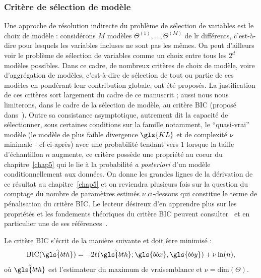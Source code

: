 \subsubsection{Critère de sélection de modèle} \label{subsubsec:choix_modele}

Une approche de résolution indirecte du problème de sélection de variables est le choix de modèle : considérons $M$ modèles $\Theta^{(1)},\dots,\Theta^{(M)}$ de \gls{lr} différents, c'est-à-dire pour lesquels les variables incluses ne sont pas les mêmes. On peut d'ailleurs voir le problème de sélection de variables comme un choix entre tous les $2^d$ modèles possibles. Dans ce cadre, de nombreux critères de choix de modèle, voire d'aggrégation de modèles, c'est-à-dire de sélection de tout ou partie de ces modèles en pondérant leur contribution globale, ont été proposés. La justification de ces critères sort largement du cadre de ce manuscrit ; aussi nous nous limiterons, dans le cadre de la sélection de modèle, au critère BIC (proposé dans~\cite{BIC}). Outre sa consistance asymptotique, autrement dit la capacité de sélectionner, sous certaines conditions sur la famille notamment, le ``quasi-vrai'' modèle (le modèle de plus faible divergence $\gls{KL}$ et de complexité $\nu$ minimale - cf ci-après) avec une probabilité tendant vers $1$ lorsque la taille d'échantillon $n$ augmente, ce critère possède une propriété au coeur du chapitre~\ref{chap5} qui le lie à la probabilité \textit{a posteriori} d'un modèle conditionnellement aux données. On donne les grandes lignes de la dérivation de ce résultat au chapitre~\ref{chap5} et on reviendra plusieurs fois sur la question du comptage du nombre de paramètres estimés $\nu$ ci-dessous qui constitue le terme de pénalisation du critère BIC. Le lecteur désireux d'en apprendre plus sur les propriétés et les fondements théoriques du critère BIC peuvent consulter~\cite{lebarbier} et en particulier une de ses références~\cite{burnham2003model}.

Le critère BIC s'écrit de la manière suivante et doit être minimisé :
\begin{equation}
    \label{eq:BIC}
    \text{BIC}(\hat{\gls{bth}}) =  -2 \ell(\hat{\gls{bth}} ; \gls{bbx},\gls{bby}) + \nu \ln (n),
\end{equation}
où $\hat{\gls{bth}}$ est l'estimateur du maximum de vraisemblance et $\nu = \text{dim}(\Theta)$.


%
%
%
%
%


